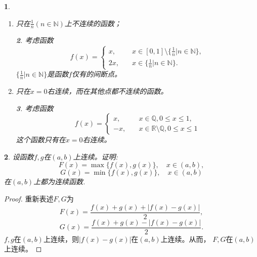 \documentclass[utf8]{book}
\newtheorem{example}{}[section]             %
\newtheorem{solution}{}
\begin{document}
\begin{example}
\begin{enumerate}
\begin{solution}
考虑三个函数的乘积$f=f_1\cdot f_2\cdot f_3$. 此函数只在$\frac{1}{2},\frac{1}{3},\frac{1}{4}$上连续。
\end{solution}
\item 只在$\frac{1}{n}(n\in\mathbb{N})$上不连续的函数；
\begin{solution}考虑函数
$$
f(x) = 
\begin{cases}
x, \quad &x\in[0,1]\setminus\{\frac{1}{n}| n\in\mathbb{N}\},\\
2x, \quad &x\in \{\frac{1}{n}| n\in\mathbb{N}\}.
\end{cases}
$$
$\{\frac{1}{n}| n\in\mathbb{N}\}$是函数$f$仅有的间断点。
\end{solution}
\item 只在$x=0$右连续，而在其他点都不连续的函数。
\begin{solution}考虑函数
$$
f(x) = 
\begin{cases}
x, \quad &x\in\mathbb{Q}, 0\leq x\leq 1,\\
-x, \quad &x\in\mathbb{R}\setminus\mathbb{Q}, 0\leq x\leq 1
\end{cases}
$$
这个函数只有在$x=0$右连续。
\end{solution}
\end{enumerate}
\end{example}
\begin{example}
设函数$f,g$在$(a,b)$上连续。证明:
$$F(x)=\max\{f(x),g(x)\},\quad x\in(a,b),$$
$$G(x)=\min\{f(x),g(x)\},\quad x\in(a,b)$$
在$(a,b)$上都为连续函数.
\end{example}
\begin{proof}重新表述$F,G$为
$$F(x) = \frac{f(x)+g(x) + |f(x)-g(x)|}{2},$$
$$G(x) = \frac{f(x)+g(x) - |f(x)-g(x)|}{2}.$$
$f,g$在$(a,b)$上连续，则$|f(x)-g(x)|$在$(a,b)$上连续。从而， $F,G$在$(a,b)$
上连续。
\end{proof}
\end{document}
